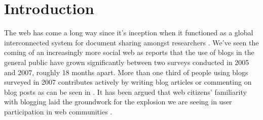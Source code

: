 \chapter{Introduction}

%
%

The web has come a long way since it's inception when it functioned as a
global interconnected system for document sharing amongst researchers
\citep[p.~82]{bernerslee92}. We've
seen the coming of an increasingly more social web as
\citet[ch.~1, p.~2]{rosa07} reports that the
use of blogs in the general public%
have grown significantly between two surveys conducted in 2005 and 2007,
roughly 18 months apart.
More than one third of people using blogs surveyed in 2007 contributes
actively by writing blog articles or commenting on blog posts as can be seen
in 
\citep[ch.~1, p.~6]{rosa07}.
It has been argued that web citizens'
familiarity with blogging laid the groundwork for the explosion we are seeing
in user participation in web communities \citep{weiss05,beer07}.

